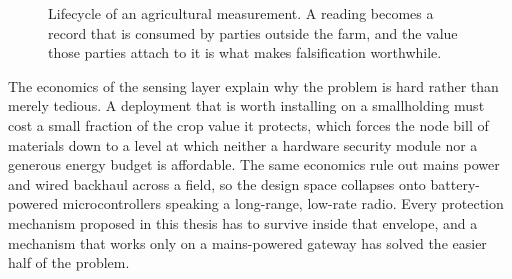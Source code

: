 \documentclass[12pt,a4paper,oneside]{book}
\begin{document}
\begin{figure}[htbp]
  \centering
  \caption{Lifecycle of an agricultural measurement. A reading becomes a record
           that is consumed by parties outside the farm, and the value those
           parties attach to it is what makes falsification worthwhile.}
  \label{fig:lifecycle}
\end{figure}

The economics of the sensing layer explain why the problem is hard rather than
merely tedious. A deployment that is worth installing on a smallholding must
cost a small fraction of the crop value it protects, which forces the node bill
of materials down to a level at which neither a hardware security module nor a
generous energy budget is affordable. The same economics rule out mains power
and wired backhaul across a field, so the design space collapses onto
battery-powered microcontrollers speaking a long-range, low-rate radio. Every
protection mechanism proposed in this thesis has to survive inside that
envelope, and a mechanism that works only on a mains-powered gateway has solved
the easier half of the problem.
\end{document}
